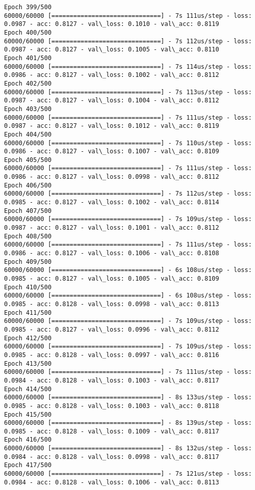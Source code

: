 \documentclass[11pt]{article}
\begin{document}
\begin{Verbatim}[commandchars=\\\{\}]
Epoch 399/500
60000/60000 [==============================] - 7s 111us/step - loss: 0.0987 - acc: 0.8127 - val\_loss: 0.1010 - val\_acc: 0.8119
Epoch 400/500
60000/60000 [==============================] - 7s 112us/step - loss: 0.0987 - acc: 0.8127 - val\_loss: 0.1005 - val\_acc: 0.8110
Epoch 401/500
60000/60000 [==============================] - 7s 114us/step - loss: 0.0986 - acc: 0.8127 - val\_loss: 0.1002 - val\_acc: 0.8112
Epoch 402/500
60000/60000 [==============================] - 7s 113us/step - loss: 0.0987 - acc: 0.8127 - val\_loss: 0.1004 - val\_acc: 0.8112
Epoch 403/500
60000/60000 [==============================] - 7s 111us/step - loss: 0.0987 - acc: 0.8127 - val\_loss: 0.1012 - val\_acc: 0.8119
Epoch 404/500
60000/60000 [==============================] - 7s 110us/step - loss: 0.0986 - acc: 0.8127 - val\_loss: 0.1007 - val\_acc: 0.8109
Epoch 405/500
60000/60000 [==============================] - 7s 111us/step - loss: 0.0986 - acc: 0.8127 - val\_loss: 0.0998 - val\_acc: 0.8112
Epoch 406/500
60000/60000 [==============================] - 7s 112us/step - loss: 0.0985 - acc: 0.8127 - val\_loss: 0.1002 - val\_acc: 0.8114
Epoch 407/500
60000/60000 [==============================] - 7s 109us/step - loss: 0.0987 - acc: 0.8127 - val\_loss: 0.1001 - val\_acc: 0.8112
Epoch 408/500
60000/60000 [==============================] - 7s 111us/step - loss: 0.0986 - acc: 0.8127 - val\_loss: 0.1006 - val\_acc: 0.8108
Epoch 409/500
60000/60000 [==============================] - 6s 108us/step - loss: 0.0985 - acc: 0.8127 - val\_loss: 0.1005 - val\_acc: 0.8109
Epoch 410/500
60000/60000 [==============================] - 6s 108us/step - loss: 0.0985 - acc: 0.8128 - val\_loss: 0.0998 - val\_acc: 0.8113
Epoch 411/500
60000/60000 [==============================] - 7s 109us/step - loss: 0.0985 - acc: 0.8127 - val\_loss: 0.0996 - val\_acc: 0.8112
Epoch 412/500
60000/60000 [==============================] - 7s 109us/step - loss: 0.0985 - acc: 0.8128 - val\_loss: 0.0997 - val\_acc: 0.8116
Epoch 413/500
60000/60000 [==============================] - 7s 111us/step - loss: 0.0984 - acc: 0.8128 - val\_loss: 0.1003 - val\_acc: 0.8117
Epoch 414/500
60000/60000 [==============================] - 8s 133us/step - loss: 0.0985 - acc: 0.8128 - val\_loss: 0.1003 - val\_acc: 0.8118
Epoch 415/500
60000/60000 [==============================] - 8s 139us/step - loss: 0.0985 - acc: 0.8128 - val\_loss: 0.1009 - val\_acc: 0.8117
Epoch 416/500
60000/60000 [==============================] - 8s 132us/step - loss: 0.0984 - acc: 0.8128 - val\_loss: 0.0998 - val\_acc: 0.8117
Epoch 417/500
60000/60000 [==============================] - 7s 121us/step - loss: 0.0984 - acc: 0.8128 - val\_loss: 0.1006 - val\_acc: 0.8113

\end{Verbatim}
\end{document}
